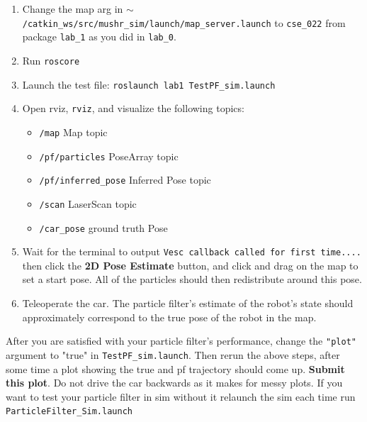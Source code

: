 \documentclass[final]{article}
\newcommand{\code}[1]{\texttt{#1}}
\newcommand{\cmdline}[1]{\colorbox{gray!30}{\texttt{#1}}}
\begin{document}
\begin{enumerate}
\item Change the map arg in \code{$\sim$/catkin\_ws/src/mushr\_sim/launch/map\_server.launch} to \code{cse\_022} from package \code{lab\_1} as you did in \code{lab\_0}.
\item Run \code{roscore}
\item Launch the test file: \cmdline{roslaunch lab1 TestPF\_sim.launch}
\item Open rviz, \cmdline{rviz}, and visualize the following topics:
\begin{itemize}
    \item \code{/map} Map topic
    \item \code{/pf/particles} PoseArray topic
    \item \code{/pf/inferred\_pose} Inferred Pose topic
    \item \code{/scan} LaserScan topic
    \item \code{/car\_pose} ground truth Pose
\end{itemize}
\item Wait for the terminal to output \code{Vesc callback called for first time....} then click the \textbf{2D Pose Estimate} button, and click and drag on the map to set a start pose. All of the particles should then redistribute around this pose.
\item Teleoperate the car. The particle filter's estimate of the robot's state should approximately correspond to the true pose of the robot in the map.
\end{enumerate}
After you are satisfied with your particle filter's performance, change the \code{"plot"} argument to "true" in \code{TestPF\_sim.launch}. Then rerun the above steps, after some time a plot showing the true and pf trajectory should come up. \textbf{Submit this plot}. Do not drive the car backwards as it makes for messy plots. If you want to test your particle filter in sim without it relaunch the sim each time run \code{ParticleFilter\_Sim.launch}
\end{document}
